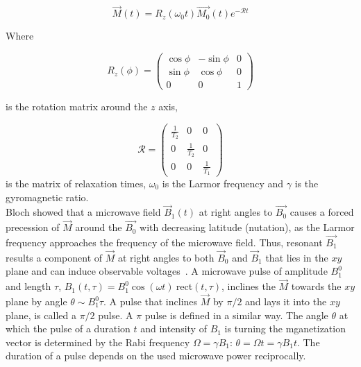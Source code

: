 \begin{equation}
\vec{M}(t)=R_z(\omega_0t)\vec{M_0}(t)e{^{-\mathscr{R}t}}
\end{equation}

Where 

\begin{equation}
R_z(\phi)=
\begin{pmatrix}
    \cos{\phi} & -\sin{\phi} & 0\\
	\sin{\phi} & \cos{\phi} & 0\\
	0 & 0 & 1
  \end{pmatrix}
\end{equation}

is the rotation matrix around the $z$ axis, 

\begin{equation}
\mathscr{R}=
\begin{pmatrix}
    \frac{1}{T_2} & 0 & 0\\
	0 & \frac{1}{T_2} & 0\\
	0 & 0 & \frac{1}{T_1}
  \end{pmatrix}
\end{equation}
is the matrix of relaxation times, $\omega_0$ is the Larmor frequency and $\gamma$ is the gyromagnetic ratio.\\


Bloch showed that a microwave field $\vec{B}_1(t)$ at right angles to $\vec{B_0}$ causes a forced precession of $\vec{M}$ around the $\vec{B_0}$ with decreasing latitude (nutation), as the Larmor frequency
approaches the frequency of the microwave field. Thus, resonant $\vec{B_1}$ results a component of $\vec{M}$ at right angles to both $\vec{B}_0$ and $\vec{B}_1$ that lies in the $xy$ plane and can induce observable voltages~\cite{Bloch_1946}. A microwave pulse of amplitude $B_1^0$ and length $\tau$, $B_1(t,\tau) = B_1^0\cos(\omega t)~$rect$(t,\tau)$, inclines the $\vec{M}$ towards the $xy$ plane by angle $\theta \sim B_1^0\tau$. A pulse that inclines $\vec{M}$ by $\pi/2$ and lays it into the $xy$ plane, is called a $\pi/2$ pulse. A $\pi$ pulse is defined in a similar way. The angle $\theta$ at which the pulse of a duration $t$ and intensity of $B_1$ is turning the mganetization vector is determined by the Rabi frequency $\Omega=\gamma B_1$: $\theta=\Omega t = \gamma B_1 t$. The duration of a pulse depends on the used microwave power reciprocally.\\
\newpage


